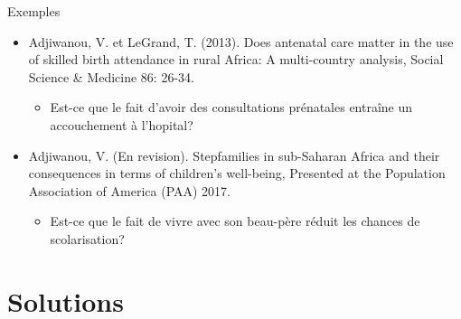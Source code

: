 \documentclass[ignorenonframetext,]{beamer}
\providecommand{\tightlist}{%
  \setlength{\itemsep}{0pt}\setlength{\parskip}{0pt}}
\begin{document}
\begin{frame}{Exemples}
\protect\hypertarget{exemples-1}{}

\begin{itemize}
\tightlist
\item
  Adjiwanou, V. et LeGrand, T. (2013). Does antenatal care matter in the
  use of skilled birth attendance in rural Africa: A multi-country
  analysis, Social Science \& Medicine 86: 26-34.

  \begin{itemize}
  \tightlist
  \item
    Est-ce que le fait d'avoir des consultations prénatales entraîne un
    accouchement à l'hopital?
  \end{itemize}
\item
  Adjiwanou, V. (En revision). Stepfamilies in sub-Saharan Africa and
  their consequences in terms of children's well-being, Presented at the
  Population Association of America (PAA) 2017.

  \begin{itemize}
  \tightlist
  \item
    Est-ce que le fait de vivre avec son beau-père réduit les chances de
    scolarisation?
  \end{itemize}
\end{itemize}

\end{frame}

\hypertarget{solutions}{%
\section{Solutions}\label{solutions}}
\end{document}
